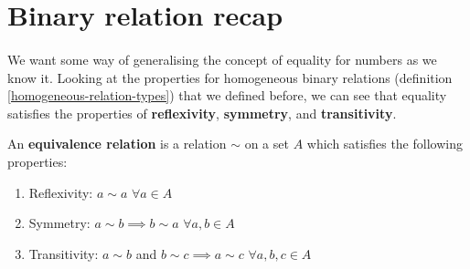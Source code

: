 \documentclass[../abstract_algebra.tex]{subfiles}
\begin{document}
    \section{Binary relation recap}
        \paragraph{}
        We want some way of generalising the concept of equality for numbers as we know it.
        Looking at the properties for homogeneous binary relations (definition \ref{homogeneous-relation-types}) that we defined before, we can see that equality satisfies the properties of \textbf{reflexivity}, \textbf{symmetry}, and \textbf{transitivity}.
        \begin{definition}
            An \textbf{equivalence relation} is a relation $\sim $ on a set $A$ which satisfies the following properties:
            \begin{enumerate}[label={\upshape(\roman*)}]
                \item Reflexivity: $a\sim a$ $\forall a\in A$
                \item Symmetry: $a\sim b\implies b\sim a$ $\forall a,b\in A$
                \item Transitivity: $a\sim b$ and $b\sim c\implies a\sim c$ $\forall a,b,c\in A$
            \end{enumerate}
        \end{definition}
        
\end{document}
